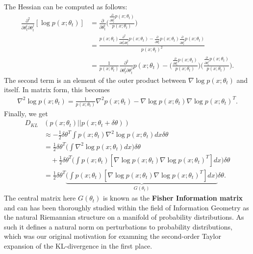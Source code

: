 The Hessian can be computed as follows:
\begin{align*}
	\frac{\partial^2}{\partial \theta_t^{i}\partial \theta_t^{j}}[\log p(x;\theta_t)] &= \frac{\partial}{\partial \theta_t^{i}}\Bigg(\frac{\frac{\partial}{\partial \theta_t^{j}}  p(x;\theta_t)}{p(x;\theta_t)}\Bigg)\\
	&= \frac{p(x;\theta_t)\frac{\partial^2}{\partial \theta_t^{i}\partial \theta_t^{j}} p(x;\theta_t) - \frac{\partial}{\partial \theta_t^{i}}p(x;\theta_t)\frac{\partial}{\partial \theta_t^{j}}p(x;\theta_t)}{p(x;\theta_t)^2}\\
	&= \frac{1}{p(x;\theta_t)}\frac{\partial^2}{\partial \theta_t^{i}\partial \theta_t^{j}} p(x;\theta_t) - \Bigg(\frac{\frac{\partial}{\partial \theta_t^{i}}p(x;\theta_t)}{p(x;\theta_t)}\Bigg)\Bigg(\frac{\frac{\partial}{\partial \theta_t^{j}}p(x;\theta_t)}{p(x;\theta_t)}\Bigg).
\end{align*}
The second term is an element of the outer product between $\nabla \log p(x;\theta_t)$ and itself. In matrix form, this becomes 
\begin{align*}
	\nabla^2 \log p(x;\theta_t) = \frac{1}{p(x;\theta_t)}\nabla^2 p(x;\theta_t) - \nabla \log p(x;\theta_t) \nabla \log  p(x;\theta_t)^T. 
\end{align*}
Finally, we get
\begin{align*}
	D_{KL}&(p(x;\theta_t)||p(x;\theta_t+\delta \theta))\\ &\approx -\frac{1}{2}\delta\theta^T\int p(x;\theta_t) \nabla^2 \log p(x;\theta_t) dx \delta\theta\\
	&= \frac{1}{2}\delta\theta^T\Bigg(\int \nabla^2 \log p(x;\theta_t) dx\Bigg) \delta\theta \\
	&\quad + \frac{1}{2}\delta\theta^T \Bigg(\int p(x;\theta_t) [\nabla \log p(x;\theta_t) \nabla \log  p(x;\theta_t)^T]dx\Bigg) \delta\theta \\
	&= \frac{1}{2}\delta\theta^T \underbrace{\Bigg(\int p(x;\theta_t) [\nabla \log p(x;\theta_t) \nabla \log  p(x;\theta_t)^T]dx\Bigg)}_{G(\theta_t)} \delta\theta.
\end{align*}
The central matrix here $G(\theta_t)$ is known as the \textbf{Fisher Information matrix} and can has been thoroughly studied within the field of Information Geometry as the natural Riemannian structure on a manifold of probability distributions. As such it defines a natural norm on perturbations to probability distributions, which was our original motivation for examning the second-order Taylor expansion of the KL-divergence in the first place. 

